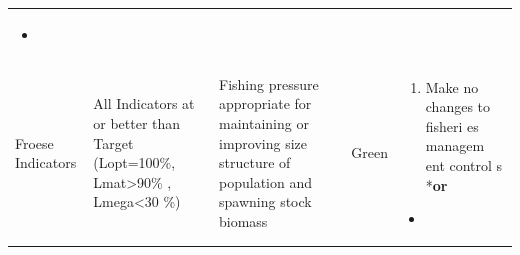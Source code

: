 \documentclass[]{book}
\providecommand{\tightlist}{%
  \setlength{\itemsep}{0pt}\setlength{\parskip}{0pt}}
\begin{document}
\begin{longtable}[]{@{}lllll@{}}
\begin{minipage}[t]{0.19\columnwidth}
\begin{itemize}
\item
\end{itemize}\strut
\end{minipage}\tabularnewline
\begin{minipage}[t]{0.19\columnwidth}\raggedright\strut
Froese Indicators\strut
\end{minipage} & \begin{minipage}[t]{0.19\columnwidth}\raggedright\strut
All Indicators at or better than Target (Lopt=100\%,
Lmat\textgreater{}90\% , Lmega\textless{}30 \%)\strut
\end{minipage} & \begin{minipage}[t]{0.19\columnwidth}\raggedright\strut
Fishing pressure appropriate for maintaining or improving size structure
of population and spawning stock biomass\strut
\end{minipage} & \begin{minipage}[t]{0.19\columnwidth}\raggedright\strut
Green\strut
\end{minipage} & \begin{minipage}[t]{0.19\columnwidth}\raggedright\strut
\begin{enumerate}
\def\labelenumi{\arabic{enumi}.}
\tightlist
\item
  Make no changes to fisheri es managem ent control s *\textbf{or}
\end{enumerate}

\begin{itemize}
\item
\end{itemize}


\end{minipage}
\end{longtable}
\end{document}
